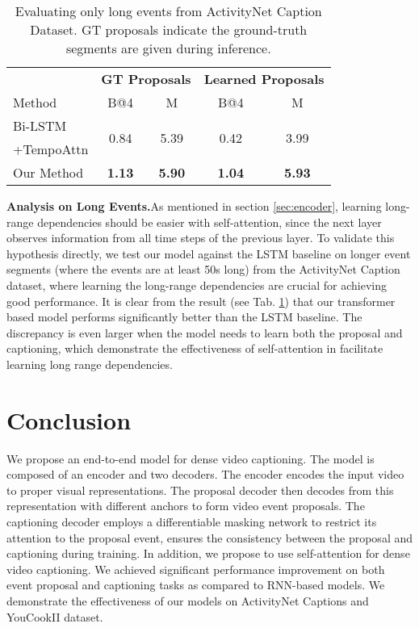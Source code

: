 \documentclass[10pt,twocolumn,letterpaper]{article}
\begin{document}
\begin{table}[t]
\centering
\caption{Evaluating only long events from ActivityNet Caption Dataset. GT proposals indicate the ground-truth segments are given during inference.}
\label{tbl:long_events_only}
    {\small
\begin{tabular}{lcccc}
\toprule
& \multicolumn{2}{c}{\textbf{GT Proposals}} & \multicolumn{2}{c}{\textbf{Learned Proposals}} \\
Method & B@4 & M & B@4 & M \\
\midrule
Bi-LSTM & \multirow{2}{*}{0.84} & \multirow{2}{*}{5.39} & \multirow{2}{*}{0.42} & \multirow{2}{*}{3.99} 
\\
+TempoAttn \\
\midrule
Our Method & \textbf{1.13} & \textbf{5.90} & \textbf{1.04} & \textbf{5.93} \\ 
\bottomrule
\end{tabular}
    }
    \vspace{-10pt}
\end{table}

\noindent\textbf{Analysis on Long Events.}\quad As mentioned in section \ref{sec:encoder}, learning long-range dependencies should be easier with self-attention, since the next layer observes information from all time steps of the previous layer. To validate this hypothesis directly, we test our model against the LSTM baseline on longer event segments (where the events are at least 50s long) from the ActivityNet Caption dataset, where learning the long-range dependencies are crucial for achieving good performance. It is clear from the result (see Tab. \ref{tbl:long_events_only}) that our transformer based model performs significantly better than the LSTM baseline. The discrepancy is even larger when the model needs to learn both the proposal and captioning, which demonstrate the effectiveness of self-attention in facilitate learning long range dependencies.

\section{Conclusion}
We propose an end-to-end model for dense video captioning. The model is composed of an encoder and two decoders. The encoder encodes the input video to proper visual representations. The proposal decoder then decodes from this representation with different anchors to form video event proposals. The captioning decoder employs a differentiable masking network to restrict its attention to the proposal event, ensures the consistency between the proposal and captioning during training. In addition, we propose to use self-attention for dense video captioning. We achieved significant performance improvement on both event proposal and captioning tasks as compared to RNN-based models. We demonstrate the effectiveness of our models on ActivityNet Captions and YouCookII dataset.
\end{document}
